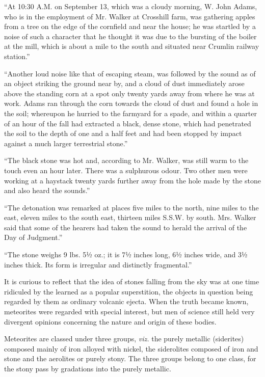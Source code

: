 \documentclass[a4paper, 12pt, oneside]{article}
\begin{document}
``At 10:30 A.M. on September 13, which was a cloudy morning, W. John Adams, who is in the employment of Mr. Walker at Crosshill farm, was gathering apples from a tree on the edge of the cornfield and near the house; he was startled by a noise of such a character that he thought it was due to the bursting of the boiler at the mill, which is about a mile to the south and situated near Crumlin railway station.''

``Another loud noise like that of escaping steam, was followed by the sound as of an object striking the ground near by, and a cloud of dust immediately arose above the standing corn at a spot only twenty yards away from where he was at work. Adams ran through the corn towards the cloud of dust and found a hole in the soil; whereupon he hurried to the farmyard for a spade, and within a quarter of an hour of the fall had extracted a black, dense stone, which had penetrated the soil to the depth of one and a half feet and had been stopped by impact against a much larger terrestrial stone.''

``The black stone was hot and, according to Mr. Walker, was still warm to the touch even an hour later. There was a sulphurous odour. Two other men were working at a haystack twenty yards further away from the hole made by the stone and also heard the sounds.''

``The detonation was remarked at places five miles to the north, nine miles to the east, eleven miles to the south east, thirteen miles S.S.W. by south. Mrs. Walker said that some of the hearers had taken the sound to herald the arrival of the Day of Judgment.''

``The stone weighs 9 lbs. 5½ oz.; it is 7½ inches long, 6½ inches wide, and 3½ inches thick. Its form is irregular and distinctly fragmental.''

It is curious to reflect that the idea of stones falling from the sky was at one time ridiculed by the learned as a popular superstition, the objects in question being regarded by them as ordinary volcanic ejecta. When the truth became known, meteorites were regarded with special interest, but men of science still held very divergent opinions concerning the nature and origin of these bodies.

Meteorites are classed under three groups, \emph{viz.} the purely metallic (siderites) composed mainly of iron alloyed with nickel, the siderolites composed of iron and stone and the aerolites or purely stony. The three groups belong to one class, for the stony pass by gradations into the purely metallic.
\end{document}
